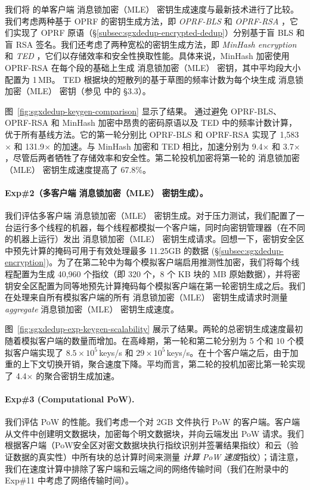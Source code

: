 我们将 \sysnameS 的单客户端 消息锁加密（MLE） 密钥生成速度与最新技术进行了比较。我们考虑两种基于 OPRF 的密钥生成方法，即 \textit{ OPRF-BLS} \cite{armknecht15} 和 \textit{ OPRF-RSA} \cite{bellare13b}，它们实现了 OPRF 原语（\S\ref{subsec:sgxdedup-encrypted-dedup}）分别基于盲 BLS 和盲 RSA 签名。我们还考虑了两种宽松的密钥生成方法，即 \textit{ MinHash encryption} \cite{qin17} 和 \textit{ TED} \cite{li20b}，它们以存储效率和安全性换取性能。具体来说，MinHash 加密使用 OPRF-RSA 在每个段的基础上生成 消息锁加密（MLE） 密钥，其中平均段大小配置为 1\,MB。 TED 根据块的短散列的基于草图的频率计数为每个块生成 消息锁加密（MLE） 密钥（参见 \cite{li20b} 中的 \S3.3）。

图~\ref{fig:sgxdedup-keygen-comparison} 显示了结果。 \sysnameS 通过避免 OPRF-BLS、OPRF-RSA 和 MinHash 加密中昂贵的密码原语以及 TED 中的频率计数计算，优于所有基线方法。它的第一轮分别比 OPRF-BLS 和 OPRF-RSA 实现了 1,583$\times$ 和 131.9$\times$ 的加速。与 MinHash 加密和 TED 相比，加速分别为 9.4$\times$ 和 3.7$\times$，尽管后两者牺牲了存储效率和安全性。第二轮投机加密将第一轮的 消息锁加密（MLE） 密钥生成速度提高了 67.8\%。



\paragraph*{Exp\#2（多客户端 消息锁加密（MLE） 密钥生成）。} 我们评估多客户端 消息锁加密（MLE） 密钥生成。对于压力测试，我们配置了一台运行多个线程的机器，每个线程都模拟一个客户端，同时向密钥管理器（在不同的机器上运行）发出 消息锁加密（MLE） 密钥生成请求。回想一下，密钥安全区中预先计算的掩码可用于有效处理最多 11.25GB 的数据 (\S\ref{subsec:sgxdedup-encryption})。为了在第二轮中为每个模拟客户端启用推测性加密，我们将每个线程配置为生成 40,960 个指纹（即 320 个，8 个 KB 块的 MB 原始数据），并将密钥安全区配置为同等地预先计算掩码每个模拟客户端在第一轮密钥生成之后。我们在处理来自所有模拟客户端的所有 消息锁加密（MLE） 密钥生成请求时测量 \textit{ aggregate} 消息锁加密（MLE） 密钥生成速度。

图~\ref{fig:sgxdedup-exp-keygen-scalability} 展示了结果。两轮的总密钥生成速度最初随着模拟客户端的数量而增加。在高峰期，第一轮和第二轮分别为 5 个和 10 个模拟客户端实现了 $8.5\times 10^5$\,keys/s 和 $29\times 10^5$\,keys/s。在十个客户端之后，由于加重的上下文切换开销，聚合速度下降。平均而言，第二轮的投机加密比第一轮实现了 4.4$\times$ 的聚合密钥生成加速。


\paragraph*{Exp\#3 (Computational PoW).} 我们评估 PoW 的性能。我们考虑一个对 2GB 文件执行 PoW 的客户端。客户端从文件中创建明文数据块，加密每个明文数据块，并向云端发出 PoW 请求。我们根据客户端（PoW安全区对密文数据块执行指纹识别并签署结果指纹）和云（验证数据的真实性）中所有块的总计算时间来测量 \textit{ 计算 PoW 速度}指纹）；请注意，我们在速度计算中排除了客户端和云端之间的网络传输时间（我们在附录中的 Exp\#11 中考虑了网络传输时间）。

